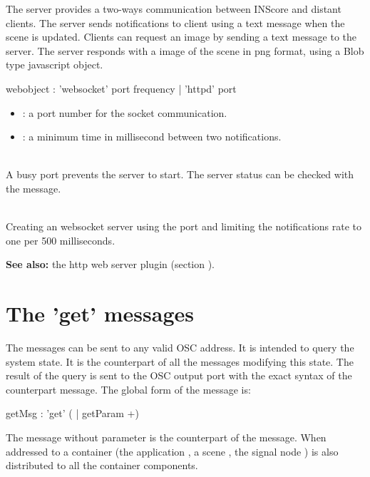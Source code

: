 \documentclass[a4paper,twoside]{report}
\newcommand{\toplevel}[1]	{\chapter{#1}}
\renewcommand{\seealso}		{\textbf{See also: }}
\begin{document}
The  server provides a two-ways communication between INScore and distant clients. The server sends notifications to client using a  text message when the scene is updated. Clients can request an image by sending a  text message to the server. The server responds with a image of the scene in png format, using a Blob type javascript object.


\begin{rail}
webobject :   'websocket' port frequency
			| 'httpd' port
\end{rail}

\begin{itemize}
\item {}: a port number for the socket communication.
\item {}: a minimum time in millisecond between two  notifications.
\end{itemize}

\note{} \\
A busy port prevents the server to start. The server status can be checked with the  message.

\example \\
Creating an websocket server using the port  and limiting the notifications rate to one per 500 milliseconds.

\seealso the http web server plugin (section ).



\toplevel{The 'get' messages}
\label{getsect}

The  messages can be sent to any valid OSC address. It is intended to query the system state. It is the counterpart of all the messages modifying this state.  The result of the query is sent to the OSC output port with the exact syntax of the counterpart message. 
The global form of the message is:


\begin{rail}
getMsg : 'get' ( | getParam +)
\end{rail}

The  message without parameter is the counterpart of the  message. When addressed to a container (the application , a scene , the signal node ) is also distributed to all the container components.
\end{document}

